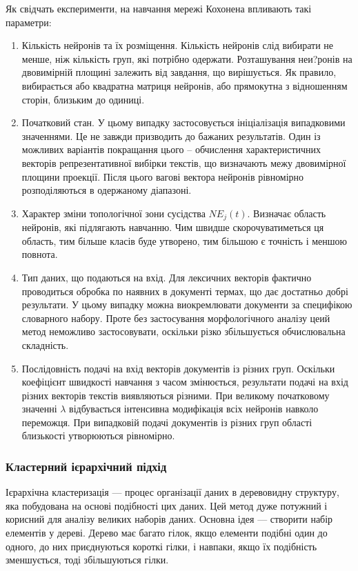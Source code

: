 Як свідчать експерименти, на навчання мережі Кохонена впливають такі параметри:
\begin{enumerate}
	\item Кількість нейронів та їх розміщення. Кількість нейронів слід вибирати не менше, ніж кількість груп, які потрібно одержати. Розташування неи?ронів на двовимірній площині залежить від завдання, що вирішується. Як правило, вибирається або квадратна матриця нейронів, або прямокутна з відношенням сторін, близьким до одиниці.
	\item Початковий стан. У цьому випадку застосовується ініціалізація випадковими значеннями. Це не завжди призводить до бажаних результатів. Один із можливих варіантів покращання цього – обчислення характеристичних векторів репрезентативної вибірки текстів, що визначають межу двовимірної площини проекції. Після цього вагові вектора нейронів рівномірно розподіляються в одержаному діапазоні.
	\item Характер зміни топологічної зони сусідства $NE_{j}(t)$. Визначає область нейронів, які підлягають навчанню. Чим швидше скорочуватиметься ця область, тим більше класів буде утворено, тим більшою є точність і меншою повнота.
	\item Тип даних, що подаються на вхід. Для лексичних векторів фактично проводиться обробка по наявних в документі термах, що дає достатньо добрі результати. У цьому випадку можна виокремлювати документи за специфікою словарного набору. Проте без застосування морфологічного аналізу цеий метод неможливо застосовувати, оскільки різко збільшується обчислювальна складність.
	\item Послідовність подачі на вхід векторів документів із різних груп. Оскільки коефіцієнт швидкості навчання з часом змінюється, результати подачі на вхід різних векторів текстів виявляються різними. При великому початковому значенні $\lambda$ відбувається інтенсивна модифікація всіх нейронів навколо переможця. При випадковій подачі документів із різних груп області близькості утворюються рівномірно.
\end{enumerate}

\subsubsection{Кластерний ієрархічний підхід}
Ієрархічна кластеризація — процес організації даних в деревовидну структуру, яка побудована на основі подібності цих даних. Цей метод дуже потужний і корисний для аналізу великих наборів даних. Основна ідея — створити набір елементів у дереві. Дерево має багато гілок, якщо елементи подібні один до одного, до них приєднуються короткі гілки, і навпаки, якщо їх подібність зменшується, тоді збільшуються гілки.

